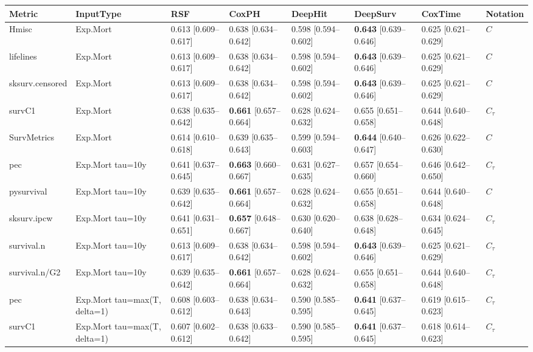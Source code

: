
\begin{tabular}{llllllll}
\toprule
Metric & InputType & RSF & CoxPH & DeepHit & DeepSurv & CoxTime & Notation\\
\midrule
Hmisc & Exp.Mort & 0.613 [0.609–0.617] & 0.638 [0.634–0.642] & 0.598 [0.594–0.602] & \textbf{0.643} [0.639–0.646] & 0.625 [0.621–0.629] & $C$\\
lifelines & Exp.Mort & 0.613 [0.609–0.617] & 0.638 [0.634–0.642] & 0.598 [0.594–0.602] & \textbf{0.643} [0.639–0.646] & 0.625 [0.621–0.629] & $C$\\
sksurv.censored & Exp.Mort & 0.613 [0.609–0.617] & 0.638 [0.634–0.642] & 0.598 [0.594–0.602] & \textbf{0.643} [0.639–0.646] & 0.625 [0.621–0.629] & $C$\\
survC1 & Exp.Mort & 0.638 [0.635–0.642] & \textbf{0.661} [0.657–0.664] & 0.628 [0.624–0.632] & 0.655 [0.651–0.658] & 0.644 [0.640–0.648] & $C_{\tau}$\\
SurvMetrics & Exp.Mort & 0.614 [0.610–0.618] & 0.639 [0.635–0.643] & 0.599 [0.594–0.603] & \textbf{0.644} [0.640–0.647] & 0.626 [0.622–0.630] & $C$\\
\addlinespace
pec & Exp.Mort tau=10y & 0.641 [0.637–0.645] & \textbf{0.663} [0.660–0.667] & 0.631 [0.627–0.635] & 0.657 [0.654–0.660] & 0.646 [0.642–0.650] & $C_{\tau}$\\
pysurvival & Exp.Mort tau=10y & 0.639 [0.635–0.642] & \textbf{0.661} [0.657–0.664] & 0.628 [0.624–0.632] & 0.655 [0.651–0.658] & 0.644 [0.640–0.648] & $C$\\
sksurv.ipcw & Exp.Mort tau=10y & 0.641 [0.631–0.651] & \textbf{0.657} [0.648–0.667] & 0.630 [0.620–0.640] & 0.638 [0.628–0.648] & 0.634 [0.624–0.645] & $C_{\tau}$\\
survival.n & Exp.Mort tau=10y & 0.613 [0.609–0.617] & 0.638 [0.634–0.642] & 0.598 [0.594–0.602] & \textbf{0.643} [0.639–0.646] & 0.625 [0.621–0.629] & $C_{\tau}$\\
survival.n/G2 & Exp.Mort tau=10y & 0.639 [0.635–0.642] & \textbf{0.661} [0.657–0.664] & 0.628 [0.624–0.632] & 0.655 [0.651–0.658] & 0.644 [0.640–0.648] & $C_{\tau}$\\
\addlinespace
pec & Exp.Mort tau=max(T, delta=1) & 0.608 [0.603–0.612] & 0.638 [0.634–0.643] & 0.590 [0.585–0.595] & \textbf{0.641} [0.637–0.645] & 0.619 [0.615–0.623] & $C_{\tau}$\\
survC1 & Exp.Mort tau=max(T, delta=1) & 0.607 [0.602–0.612] & 0.638 [0.633–0.642] & 0.590 [0.585–0.595] & \textbf{0.641} [0.637–0.645] & 0.618 [0.614–0.623] & $C_{\tau}$\\

\end{tabular}
